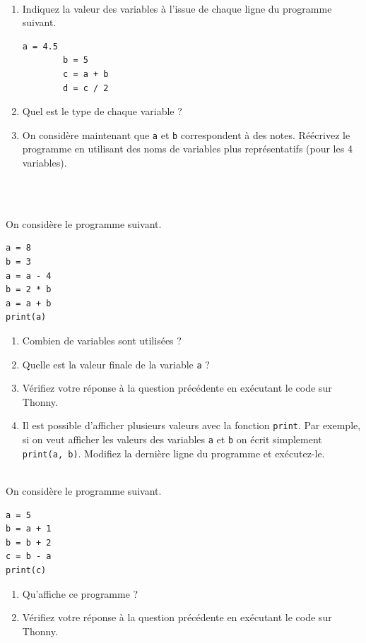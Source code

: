\documentclass[a4paper,12pt]{article}
\begin{document}
\finexo

\newpage

\exo{}  ~\\ 
\begin{enumerate}[label=\alph*)]
	\item  	Indiquez la valeur des variables à l’issue de chaque ligne du programme suivant.
	\begin{lstlisting}[numbers=none]
		a = 4.5
		b = 5
		c = a + b
		d = c / 2
	\end{lstlisting}
	\item 	Quel est le type de chaque variable ?
	\item On considère maintenant que \lstinline{a} et \lstinline{b} correspondent à des notes. Réécrivez le programme en utilisant des noms de variables plus représentatifs (pour les 4 variables).
\end{enumerate}
\begin{correction}
	~\\ 
	
\end{correction}
\finexo


\exo{}  ~\\ 
 On considère le programme \py suivant.
\begin{lstlisting}[numbers=none]
a = 8
b = 3
a = a - 4
b = 2 * b
a = a + b
print(a)
\end{lstlisting}
\begin{enumerate}[label=\alph*)]
	\item  	Combien de variables sont utilisées ?
	\item Quelle est la valeur finale de la variable \lstinline{a} ?
	\item Vérifiez votre réponse à la question précédente en exécutant le code sur Thonny.
	\item Il est possible d’afficher plusieurs valeurs avec la fonction \lstinline{print}. Par exemple, si on veut afficher les valeurs des variables \lstinline{a} et \lstinline{b} on écrit simplement \lstinline{print(a, b)}. Modifiez la dernière ligne du programme et exécutez-le.
\end{enumerate}
\finexo

\exo{}  ~\\ 
 On considère le programme \py suivant.
\begin{lstlisting}[numbers=none]
a = 5
b = a + 1
b = b + 2
c = b - a
print(c)
\end{lstlisting}
\begin{enumerate}[label=\alph*)]
	\item  	Qu’affiche ce programme ?
	\item Vérifiez votre réponse à la question précédente en exécutant le code sur Thonny.
\end{enumerate}
\begin{correction}
	~\\ 
	
\end{correction}
\finexo
\end{document}
